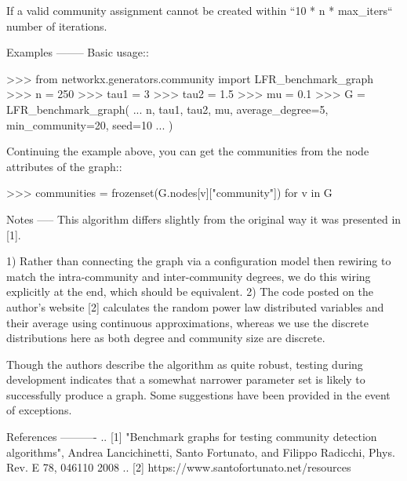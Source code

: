 \begin{DoxyVerb}
    If a valid community assignment cannot be created within ``10 *
    n * max_iters`` number of iterations.

Examples
--------
Basic usage::

    >>> from networkx.generators.community import LFR_benchmark_graph
    >>> n = 250
    >>> tau1 = 3
    >>> tau2 = 1.5
    >>> mu = 0.1
    >>> G = LFR_benchmark_graph(
    ...     n, tau1, tau2, mu, average_degree=5, min_community=20, seed=10
    ... )

Continuing the example above, you can get the communities from the
node attributes of the graph::

    >>> communities = {frozenset(G.nodes[v]["community"]) for v in G}

Notes
-----
This algorithm differs slightly from the original way it was
presented in [1].

1) Rather than connecting the graph via a configuration model then
   rewiring to match the intra-community and inter-community
   degrees, we do this wiring explicitly at the end, which should be
   equivalent.
2) The code posted on the author's website [2] calculates the random
   power law distributed variables and their average using
   continuous approximations, whereas we use the discrete
   distributions here as both degree and community size are
   discrete.

Though the authors describe the algorithm as quite robust, testing
during development indicates that a somewhat narrower parameter set
is likely to successfully produce a graph. Some suggestions have
been provided in the event of exceptions.

References
----------
.. [1] "Benchmark graphs for testing community detection algorithms",
       Andrea Lancichinetti, Santo Fortunato, and Filippo Radicchi,
       Phys. Rev. E 78, 046110 2008
.. [2] https://www.santofortunato.net/resources\end{DoxyVerb}
 \mbox{\label{namespacenetworkx_1_1generators_1_1community_ae16fcc8fc4eb0b626eb26c4e8a282ff1}} 

